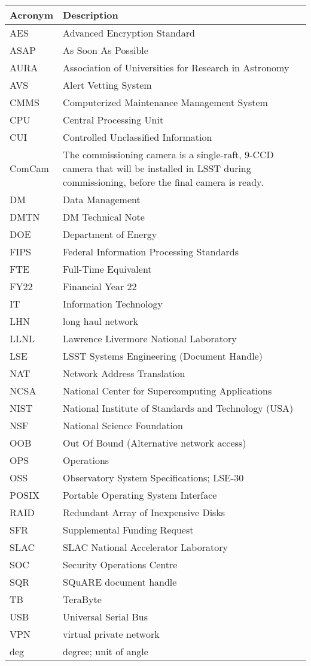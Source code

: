 \addtocounter{table}{-1}
\begin{longtable}{p{}p{}}\hline
\textbf{Acronym} & \textbf{Description}  \\\hline

AES & Advanced Encryption Standard \\\hline
ASAP & As Soon As Possible \\\hline
AURA & Association of Universities for Research in Astronomy \\\hline
AVS &  Alert Vetting System \\\hline
CMMS & Computerized Maintenance Management System \\\hline
CPU & Central Processing Unit \\\hline
CUI & Controlled Unclassified Information \\\hline
ComCam & The commissioning camera is a single-raft, 9-CCD camera that will be installed in LSST during commissioning, before the final camera is ready. \\\hline
DM & Data Management \\\hline
DMTN & DM Technical Note \\\hline
DOE & Department of Energy \\\hline
FIPS & Federal Information Processing Standards \\\hline
FTE & Full-Time Equivalent \\\hline
FY22 & Financial Year 22 \\\hline
IT & Information Technology \\\hline
LHN & long haul network \\\hline
LLNL & Lawrence Livermore National Laboratory \\\hline
LSE & LSST Systems Engineering (Document Handle) \\\hline
NAT & Network Address Translation \\\hline
NCSA & National Center for Supercomputing Applications \\\hline
NIST & National Institute of Standards and Technology (USA) \\\hline
NSF & National Science Foundation \\\hline
OOB & Out Of Bound (Alternative network access) \\\hline
OPS & Operations \\\hline
OSS & Observatory System Specifications; LSE-30 \\\hline
POSIX & Portable Operating System Interface \\\hline
RAID & Redundant Array of Inexpensive Disks \\\hline
SFR & Supplemental Funding Request \\\hline
SLAC & SLAC National Accelerator Laboratory \\\hline
SOC & Security Operations Centre \\\hline
SQR & SQuARE document handle \\\hline
TB & TeraByte \\\hline
USB & Universal Serial Bus \\\hline
VPN & virtual private network \\\hline
deg & degree; unit of angle \\\hline
\end{longtable}
